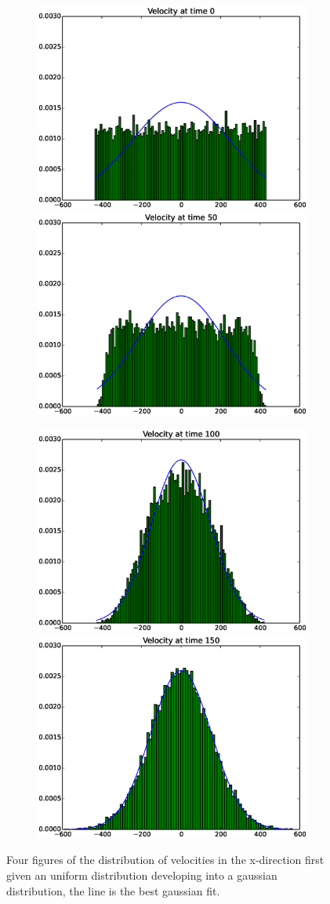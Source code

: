 \documentclass[11pt]{article}
\begin{document}
		\begin{figure}
			\begin{subfigure}{1\textwidth}
			\includegraphics[width = 0.5 \textwidth]{Figures/velocityDistribution_0.eps}
			\includegraphics[width = 0.5 \textwidth]{Figures/velocityDistribution_50.eps}
			\end{subfigure}
			\begin{subfigure}{1\textwidth}
			\includegraphics[width = 0.5 \textwidth]{Figures/velocityDistribution_100.eps}
			\includegraphics[width = 0.5 \textwidth]{Figures/velocityDistribution_150.eps}
			\end{subfigure}
			\caption{Four figures of the distribution of velocities in the x-direction first given an uniform distribution developing into a gaussian distribution, the line is the best gaussian fit.}
		\end{figure}
\end{document}
